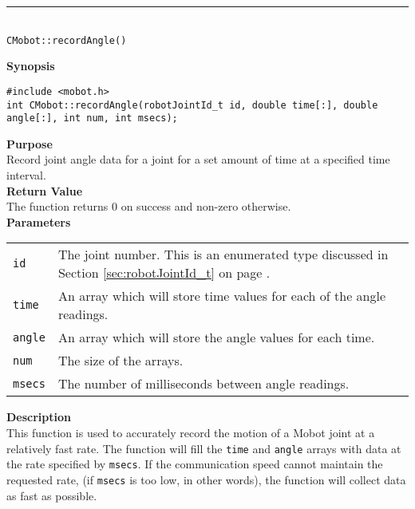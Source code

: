 \noindent
\vspace{5pt}
\rule{4.5in}{0.015in}\\
\noindent
{\LARGE \texttt{CMobot::recordAngle()}}\\
{}

\noindent
{\bf Synopsis}
\vspace{-8pt}
\begin{verbatim}
#include <mobot.h>
int CMobot::recordAngle(robotJointId_t id, double time[:], double angle[:], int num, int msecs);
\end{verbatim}

\noindent
{\bf Purpose}\\
Record joint angle data for a joint for a set amount of time at a specified time interval.\\

\noindent
{\bf Return Value}\\
The function returns 0 on success and non-zero otherwise.\\

\noindent
{\bf Parameters}\\
\vspace{-0.1in}
\begin{description}
\item               
\begin{tabular}{p{15 mm}p{145 mm}}
\texttt{id} & The joint number. This is an enumerated type 
discussed in Section \ref{sec:robotJointId_t} on page
\pageref{sec:robotJointId_t}.\\
\texttt{time} & An array which will store time values for each of the angle readings. \\
\texttt{angle} & An array which will store the angle values for each time. \\
\texttt{num} & The size of the arrays. \\
\texttt{msecs} & The number of milliseconds between angle readings.
\end{tabular}
\end{description}

\noindent
{\bf Description}\\
This function is used to accurately record the motion of a Mobot joint at a relatively fast
rate. The function will fill the \texttt{time} and \texttt{angle} arrays with data
at the rate specified by \texttt{msecs}. If the communication speed cannot maintain 
the requested rate, (if \texttt{msecs} is too low, in other words), the function will
collect data as fast as possible. 

